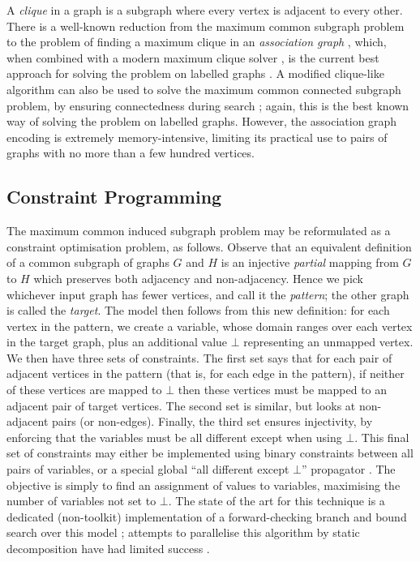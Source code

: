 \documentclass[sigconf]{acmart}
\begin{document}
A \emph{clique} in a graph is a subgraph where every vertex is adjacent to every other. There is a
well-known reduction from the maximum common subgraph problem to the problem of finding a maximum
clique in an \emph{association graph}
\citep{o:Levi73,DBLP:journals/jcamd/RaymondW02a,DBLP:conf/cp/McCreeshNPS16}, which, when combined
with a modern maximum clique solver \citep{DBLP:journals/ol/SegundoMRH13}, is the current best
approach for solving the problem on labelled graphs \citep{DBLP:conf/cp/McCreeshNPS16}. A modified
clique-like algorithm can also be used to solve the maximum common connected subgraph problem, by
ensuring connectedness during search \citep{DBLP:conf/cp/McCreeshNPS16}; again, this is the best
known way of solving the problem on labelled graphs. However, the association graph encoding is
extremely memory-intensive, limiting its practical use to pairs of graphs with no more than a few
hundred vertices.

\subsection{Constraint Programming}

The maximum common induced subgraph problem may be reformulated as a constraint optimisation
problem, as follows.  Observe that an equivalent definition of a common subgraph of graphs $G$ and
$H$ is an injective \emph{partial} mapping from $G$ to $H$ which preserves both adjacency and
non-adjacency.  Hence we pick whichever input graph has fewer vertices, and call it the
\emph{pattern}; the other graph is called the \emph{target}. The model then follows from this new
definition: for each vertex in the pattern, we create a variable, whose domain ranges over each
vertex in the target graph, plus an additional value $\bot$ representing an unmapped vertex. We then
have three sets of constraints.  The first set says that for each pair of adjacent vertices in the
pattern (that is, for each edge in the pattern), if neither of these vertices are mapped to $\bot$
then these vertices must be mapped to an adjacent pair of target vertices. The second set is
similar, but looks at non-adjacent pairs (or non-edges).  Finally, the third set ensures
injectivity, by enforcing that the variables must be all different except when using $\bot$. This
final set of constraints may either be implemented using binary constraints between all pairs of
variables, or a special global ``all different except $\bot$'' propagator
\citep{DBLP:conf/cp/PetitRB01}. The objective is simply to find an assignment of values to
variables, maximising the number of variables not set to $\bot$. The state of the art for this
technique is a dedicated (non-toolkit) implementation of a forward-checking branch and bound search
over this model \citep{DBLP:conf/cp/NdiayeS11,DBLP:conf/cp/McCreeshNPS16}; attempts to parallelise
this algorithm by static decomposition have had limited success \citep{DBLP:conf/ictai/MinotNS15}.
\end{document}
